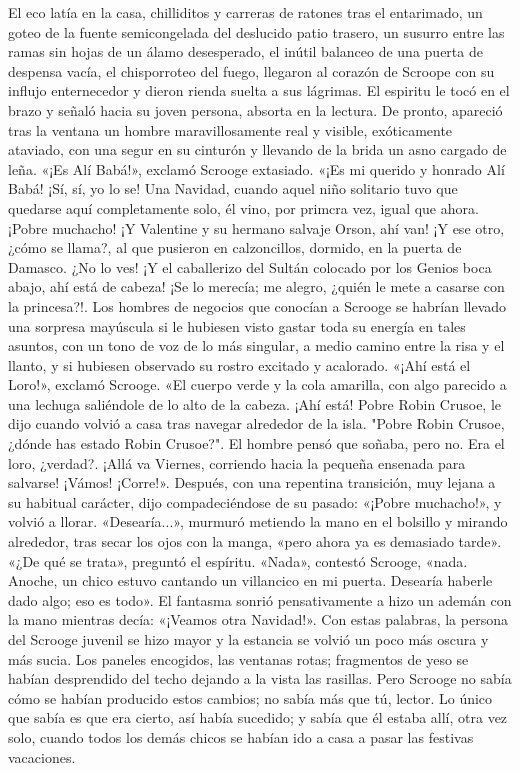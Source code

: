 \documentclass{novela}
\begin{document}
 El eco latía en la casa, chilliditos y carreras de ratones tras el entarimado, un goteo de la fuente semicongelada del deslucido patio trasero, un susurro entre las ramas sin hojas de un álamo desesperado, el inútil balanceo de una puerta de despensa vacía, el chisporroteo del fuego, llegaron al corazón de Scroope con su influjo enternecedor y dieron rienda suelta a sus lágrimas.
 El espiritu le tocó en el brazo y señaló hacia su joven persona, absorta en la lectura. De pronto, apareció tras la ventana un hombre maravillosamente real y visible, exóticamente ataviado, con una segur en su cinturón y llevando de la brida un asno cargado de leña.
 «¡Es Alí Babá!», exclamó Scrooge extasiado. «¡Es mi querido y honrado Alí Babá! ¡Sí, sí, yo lo se! Una Navidad, cuando aquel niño solitario tuvo que quedarse aquí completamente solo, él vino, por primcra vez, igual que ahora. ¡Pobre muchacho! ¡Y Valentine y su hermano salvaje Orson, ahí van! ¡Y ese otro, ¿cómo se llama?, al que pusieron en calzoncillos, dormido, en la puerta de Damasco. ¿No lo ves! ¡Y el caballerizo del Sultán colocado por los Genios boca abajo, ahí está de cabeza! ¡Se lo merecía; me alegro, ¿quién le mete a casarse con la princesa?!.
 Los hombres de negocios que conocían a Scrooge se habrían llevado una sorpresa mayúscula si le hubiesen visto gastar toda su energía en tales asuntos, con un tono de voz de lo más singular, a medio camino entre la risa y el llanto, y si hubiesen observado su rostro excitado y acalorado.
 «¡Ahí está el Loro!», exclamó Scrooge. «El cuerpo verde y la cola amarilla, con algo parecido a una lechuga saliéndole de lo alto de la cabeza. ¡Ahí está! Pobre Robin Crusoe, le dijo cuando volvió a casa tras navegar alrededor de la isla. "Pobre Robin Crusoe, ¿dónde has estado Robin Crusoe?". El hombre pensó que soñaba, pero no. Era el loro, ¿verdad?. ¡Allá va Viernes, corriendo hacia la pequeña ensenada para salvarse! ¡Vámos! ¡Corre!».
 Después, con una repentina transición, muy lejana a su habitual carácter, dijo compadeciéndose de su pasado: «¡Pobre muchacho!», y volvió a llorar.
 «Desearía...», murmuró metiendo la mano en el bolsillo y mirando alrededor, tras secar los ojos con la manga, «pero ahora ya es demasiado tarde».
 «¿De qué se trata», preguntó el espíritu.
 «Nada», contestó Scrooge, «nada. Anoche, un chico estuvo cantando un villancico en mi puerta. Desearía haberle dado algo; eso es todo».
 El fantasma sonrió pensativamente a hizo un ademán con la mano mientras decía: «¡Veamos otra Navidad!».
 Con estas palabras, la persona del Scrooge juvenil se hizo mayor y la estancia se volvió un poco más oscura y más sucia. Los paneles encogidos, las ventanas rotas; fragmentos de yeso se habían desprendido del techo dejando a la vista las rasillas. Pero Scrooge no sabía cómo se habían producido estos cambios; no sabía más que tú, lector. Lo único que sabía es que era cierto, así había sucedido; y sabía que él estaba allí, otra vez solo, cuando todos los demás chicos se habían ido a casa a pasar las festivas vacaciones.
\end{document}
